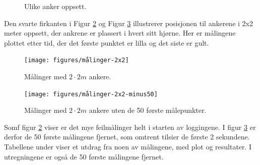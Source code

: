 \begin{figure}[htp]
    \centering
    \qquad
    \caption{Ulike anker oppsett.}%
    \label{fig:oppsett}%
\end{figure}

Den svarte firkanten i Figur \ref{fig:2x2målinger} og Figur \ref{fig:2x2målinger50} illustrerer 
posisjonen til ankerene i 2x2 meter oppsett, der ankrene er plassert i hvert sitt hjørne. 
Her er målingene plottet etter tid, der det første punktet er lilla og det siste er gult. 

\begin{figure}[htp]
\centering
\texttt{[image: figures/målinger-2x2]}
\caption{Målinger med $2\cdot2 m$ ankere.}
\label{fig:2x2målinger}
\end{figure}
\begin{figure}[htp]
\centering
\texttt{[image: figures/målinger-2x2-minus50]}
\caption{Målinger med $2\cdot2 m$ ankere uten de 50 første målepunkter.}
\label{fig:2x2målinger50}
\end{figure}

Somf figur \ref{fig:2x2målinger} viser er det mye feilmålinger helt i starten av loggingene. 
I figur \ref{fig:2x2målinger50} er derfor de 50 første målingene fjernet, som omtrent tilsier de første 2 sekundene. 
Tabellene under viser et utdrag fra noen av målingene, med plot og resultater. I utregningene er også de 50 første målingene fjernet.

